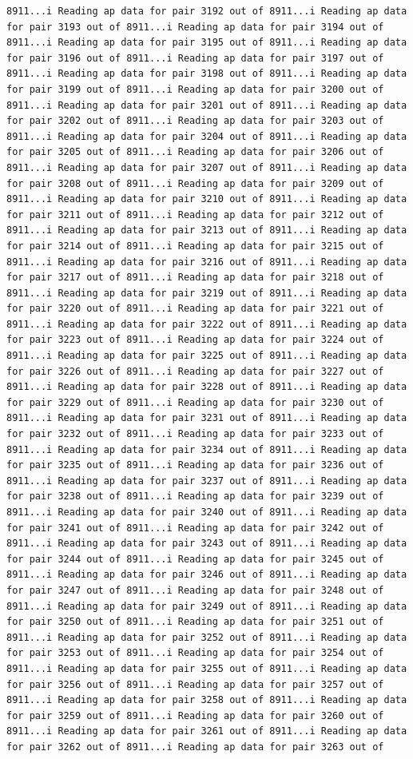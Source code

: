 \documentclass[
]{article}
\begin{document}
\begin{verbatim}
8911...i Reading ap data for pair 3192 out of 8911...i Reading ap data for pair 3193 out of 8911...i Reading ap data for pair 3194 out of 8911...i Reading ap data for pair 3195 out of 8911...i Reading ap data for pair 3196 out of 8911...i Reading ap data for pair 3197 out of 8911...i Reading ap data for pair 3198 out of 8911...i Reading ap data for pair 3199 out of 8911...i Reading ap data for pair 3200 out of 8911...i Reading ap data for pair 3201 out of 8911...i Reading ap data for pair 3202 out of 8911...i Reading ap data for pair 3203 out of 8911...i Reading ap data for pair 3204 out of 8911...i Reading ap data for pair 3205 out of 8911...i Reading ap data for pair 3206 out of 8911...i Reading ap data for pair 3207 out of 8911...i Reading ap data for pair 3208 out of 8911...i Reading ap data for pair 3209 out of 8911...i Reading ap data for pair 3210 out of 8911...i Reading ap data for pair 3211 out of 8911...i Reading ap data for pair 3212 out of 8911...i Reading ap data for pair 3213 out of 8911...i Reading ap data for pair 3214 out of 8911...i Reading ap data for pair 3215 out of 8911...i Reading ap data for pair 3216 out of 8911...i Reading ap data for pair 3217 out of 8911...i Reading ap data for pair 3218 out of 8911...i Reading ap data for pair 3219 out of 8911...i Reading ap data for pair 3220 out of 8911...i Reading ap data for pair 3221 out of 8911...i Reading ap data for pair 3222 out of 8911...i Reading ap data for pair 3223 out of 8911...i Reading ap data for pair 3224 out of 8911...i Reading ap data for pair 3225 out of 8911...i Reading ap data for pair 3226 out of 8911...i Reading ap data for pair 3227 out of 8911...i Reading ap data for pair 3228 out of 8911...i Reading ap data for pair 3229 out of 8911...i Reading ap data for pair 3230 out of 8911...i Reading ap data for pair 3231 out of 8911...i Reading ap data for pair 3232 out of 8911...i Reading ap data for pair 3233 out of 8911...i Reading ap data for pair 3234 out of 8911...i Reading ap data for pair 3235 out of 8911...i Reading ap data for pair 3236 out of 8911...i Reading ap data for pair 3237 out of 8911...i Reading ap data for pair 3238 out of 8911...i Reading ap data for pair 3239 out of 8911...i Reading ap data for pair 3240 out of 8911...i Reading ap data for pair 3241 out of 8911...i Reading ap data for pair 3242 out of 8911...i Reading ap data for pair 3243 out of 8911...i Reading ap data for pair 3244 out of 8911...i Reading ap data for pair 3245 out of 8911...i Reading ap data for pair 3246 out of 8911...i Reading ap data for pair 3247 out of 8911...i Reading ap data for pair 3248 out of 8911...i Reading ap data for pair 3249 out of 8911...i Reading ap data for pair 3250 out of 8911...i Reading ap data for pair 3251 out of 8911...i Reading ap data for pair 3252 out of 8911...i Reading ap data for pair 3253 out of 8911...i Reading ap data for pair 3254 out of 8911...i Reading ap data for pair 3255 out of 8911...i Reading ap data for pair 3256 out of 8911...i Reading ap data for pair 3257 out of 8911...i Reading ap data for pair 3258 out of 8911...i Reading ap data for pair 3259 out of 8911...i Reading ap data for pair 3260 out of 8911...i Reading ap data for pair 3261 out of 8911...i Reading ap data for pair 3262 out of 8911...i Reading ap data for pair 3263 out of 
\end{verbatim}
\end{document}
